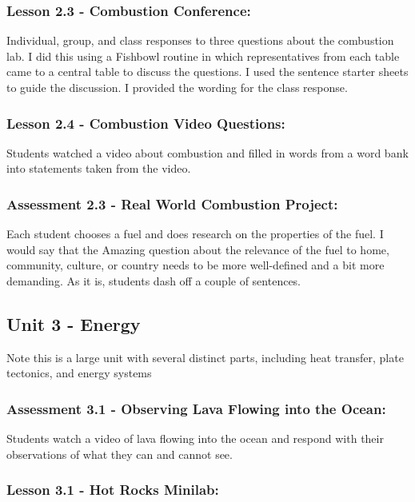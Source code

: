 \documentclass[12pt]{article}
\begin{document}
\subsubsection{Lesson 2.3 - Combustion Conference:}
\label{sec:org57489f6}

Individual, group, and class responses to three questions about the combustion lab. I did this using a Fishbowl routine in which
representatives from each table came to a central table to discuss the questions. I used
the sentence starter sheets to guide the discussion. I provided the wording for the class
response.


\subsubsection{Lesson 2.4 - Combustion Video Questions:}
\label{sec:orgc10c876}

Students watched a video about combustion and filled in words from a word bank into statements taken from the video.


\subsubsection{Assessment 2.3 - Real World Combustion Project:}
\label{sec:org419dddd}

Each student chooses a fuel and does research on the properties of the fuel. I would say that the Amazing question about the
relevance of the fuel to home, community, culture, or country needs to be more well-defined and
a bit more demanding. As it is, students dash off a couple of sentences.


\subsection{Unit 3 - Energy}
\label{sec:orgdbd3323}

Note this is a large unit with several distinct parts, including heat transfer, plate tectonics, and energy systems

\subsubsection{Assessment 3.1 - Observing Lava Flowing into the Ocean:}
\label{sec:orgc43284b}

Students watch a video of lava flowing into the ocean and respond with their observations of what they can and cannot see.


\subsubsection{Lesson 3.1 - Hot Rocks Minilab:}
\label{sec:org1b43ad5}
\end{document}
